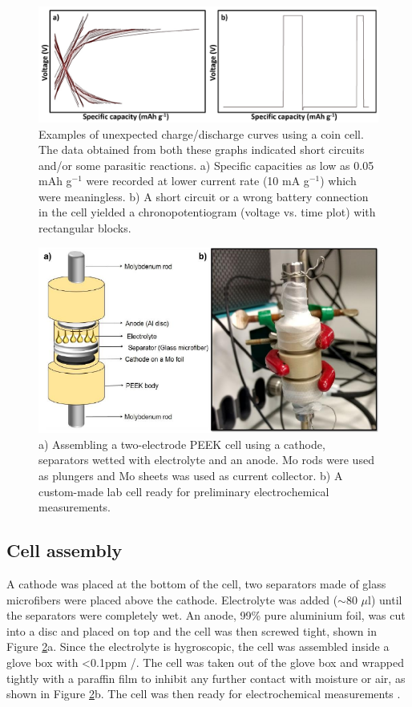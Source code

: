 \begin{figure}[tbh!]
\centering
\includegraphics[width=\textwidth]{Figures/chap3fig/weirdcdc}
\caption{Examples of unexpected charge/discharge curves using a coin cell. The data obtained from both these graphs indicated short circuits and/or some parasitic reactions. a) Specific capacities as low as 0.05 mAh g$^{-1}$ were recorded at lower current rate (10 mA g$^{-1}$) which were meaningless. b) A short circuit or a wrong battery connection in the cell yielded a chronopotentiogram (voltage vs. time plot) with rectangular blocks.}
\label{Figures/chap3fig:weirdcdc}
\end{figure}

\begin{figure}[tbh!]
\centering
\includegraphics[width=\textwidth]{Figures/chap3fig/swagelok.pdf}
\caption{a) Assembling a two-electrode PEEK cell using a cathode, separators wetted with electrolyte and an anode. Mo rods were used as plungers and Mo sheets was used as current collector. b) A custom-made lab cell ready for preliminary electrochemical measurements.}
\label{Figures/chap3fig:swagelok}
\end{figure}

\subsection*{Cell assembly}
A cathode was placed at the bottom of the cell, two separators made of glass microfibers were placed above the cathode. Electrolyte was added ($\sim$80 $\mu$l) until the separators were completely wet. An anode, 99\% pure aluminium foil, was cut into a disc and placed on top and the cell was then screwed tight, shown in Figure \ref{Figures/chap3fig:swagelok}a. Since the electrolyte is hygroscopic, the cell was assembled inside a glove box with <0.1ppm /. The cell was taken out of the glove box and wrapped tightly with a paraffin film to inhibit any further contact with moisture or air, as shown in Figure \ref{Figures/chap3fig:swagelok}b. The cell was then ready for electrochemical measurements . 

